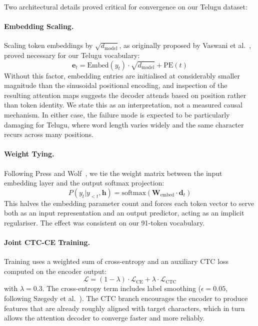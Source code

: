 \documentclass[pdflatex,sn-mathphys-num]{sn-jnl}
\begin{document}
Two architectural details proved critical for convergence on our Telugu dataset:

\paragraph{Embedding Scaling.} Scaling token embeddings by $\sqrt{d_{\text{model}}}$, as originally proposed by Vaswani et al.~\cite{vaswani2017attention}, proved necessary for our Telugu vocabulary:
\begin{equation}
    \mathbf{e}_t = \text{Embed}(y_t) \cdot \sqrt{d_{\text{model}}} + \text{PE}(t)
\end{equation}
Without this factor, embedding entries are initialised at considerably smaller magnitude than the sinusoidal positional encoding, and inspection of the resulting attention maps suggests the decoder attends based on position rather than token identity. We state this as an interpretation, not a measured causal mechanism. In either case, the failure mode is expected to be particularly damaging for Telugu, where word length varies widely and the same character recurs across many positions.

\paragraph{Weight Tying.} Following Press and Wolf~\cite{press2017output}, we tie the weight matrix between the input embedding layer and the output softmax projection:
\begin{equation}
    P(y_t | y_{<t}, \mathbf{h}) = \text{softmax}(\mathbf{W}_{\text{embed}} \cdot \mathbf{d}_t)
\end{equation}
This halves the embedding parameter count and forces each token vector to serve both as an input representation and an output predictor, acting as an implicit regulariser. The effect was consistent on our 91-token vocabulary.

\paragraph{Joint CTC-CE Training.} Training uses a weighted sum of cross-entropy and an auxiliary CTC loss computed on the encoder output:
\begin{equation}
    \mathcal{L} = (1 - \lambda) \cdot \mathcal{L}_{\text{CE}} + \lambda \cdot \mathcal{L}_{\text{CTC}}
    \label{eq:joint_loss}
\end{equation}
with $\lambda = 0.3$. The cross-entropy term includes label smoothing ($\epsilon = 0.05$, following Szegedy et al.~\cite{szegedy2016rethinking}). The CTC branch encourages the encoder to produce features that are already roughly aligned with target characters, which in turn allows the attention decoder to converge faster and more reliably.
\end{document}
